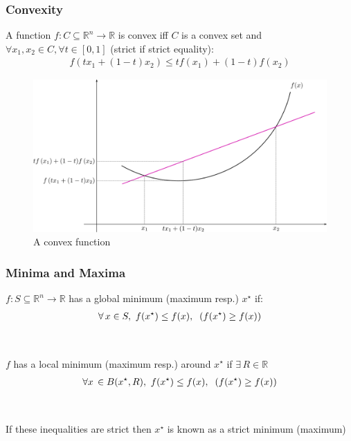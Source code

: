 \documentclass{beamer}
\def\rnum{\mathbb{R}}
\begin{document}
\begin{frame}
    \frametitle{Convexity}
    A function $f : C \subseteq \rnum^{n} \rightarrow \rnum$ is convex iff $C$
    is a convex set and $\forall x_{1}, x_{2} \in C, \forall t \in [0,1]$
    (strict if strict equality):
    \begin{align*}
        f(t x_{1} + (1-t)x_{2}) \leq t f(x_{1}) + (1-t)f(x_{2})
    \end{align*}
    \begin{figure}[t]
        \centering
        \includegraphics[scale=0.225]{function}
        \caption{A convex function}
        \label{fig:function}
    \end{figure}
\end{frame}

\begin{frame}
    \frametitle{Minima and Maxima}
    $f: S \subseteq \rnum^{n} \rightarrow \rnum$ has a global minimum (maximum
    resp.) $x^{\star}$ if:
    \begin{align*}
        \forall \, x \in S, \, \, f(x^{\star}) \leq f(x), \hspace{2mm}  (f(x^{\star}) \geq f(x))
    \end{align*}
    \\~\\
    $f$ has a local minimum (maximum resp.) around $x^{\star}$ if $\exists \, R \in
     \rnum$ 
    \begin{align*}
        \forall x \, \in B(x^{\star}, R), \, \, f(x^{\star}) \leq f(x),
        \hspace{2mm} (f(x^{\star}) \geq f(x))
    \end{align*}
    \\~\\
    If these inequalities are strict then $x^{\star}$ is known as a strict
    minimum (maximum)
\end{frame}
\end{document}
